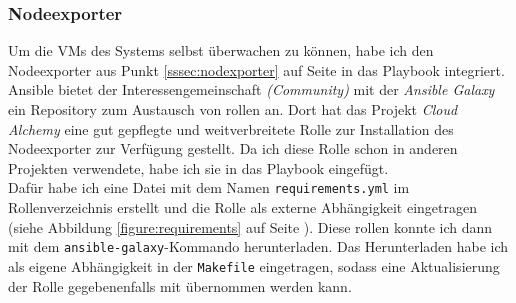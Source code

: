 \documentclass[11pt,a4paper]{article}
\begin{document}
\subsubsection{Nodeexporter}
Um die VMs des Systems selbst überwachen zu können, habe ich den Nodeexporter aus
Punkt \ref{sssec:nodexporter} auf Seite \pageref{sssec:nodexporter} in das 
Playbook integriert. Ansible bietet der Interessengemeinschaft \emph{(Community)} mit der \emph{Ansible Galaxy} ein Repository
zum Austausch von \gls{rollen} an. Dort hat das Projekt
\emph{Cloud Alchemy} eine gut gepflegte und weitverbreitete Rolle zur Installation des
Nodeexporter zur Verfügung gestellt. Da ich diese Rolle schon in anderen Projekten verwendete,
habe ich sie in das Playbook eingefügt. \\
Dafür habe ich eine Datei mit dem Namen \verb|requirements.yml| im Rollenverzeichnis
erstellt und die Rolle als externe Abhängigkeit eingetragen (siehe Abbildung \ref{figure:requirements} auf Seite \pageref{figure:requirements}).
Diese \gls{rollen} konnte ich dann mit dem \verb|ansible-galaxy|-Kommando herunterladen.
Das Herunterladen habe ich als eigene Abhängigkeit in der \verb|Makefile| eingetragen,
sodass eine Aktualisierung der Rolle gegebenenfalls mit übernommen werden kann.
\end{document}
